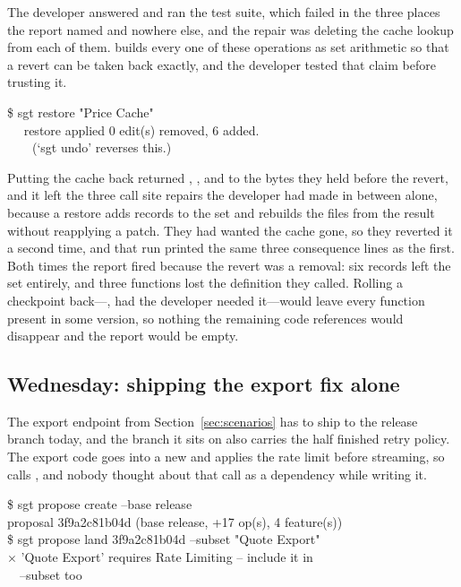 The developer answered  and ran the test suite, which failed in the three
places the report named and nowhere else, and the repair was deleting the cache lookup
from each of them. \sgt{} builds every one of these operations as set arithmetic so
that a revert can be taken back exactly, and the developer tested that claim before
trusting it.

\begin{out}
\$ sgt restore "Price Cache"\\
~~\ttok{} restore applied \ttdash{} 0 edit(s) removed, 6 added.\\
~~~~(`sgt undo' reverses this.)
\end{out}

\noindent
Putting the cache back returned , , and
 to the bytes they held before the revert, and it left the
three call site repairs the developer had made in between alone, because a restore
adds records to the set and rebuilds the files from the result without reapplying
a patch. They had wanted the cache gone, so they reverted it a second time, and
that run printed the same three consequence lines as the first.
Both times the report fired because the revert was a removal: six records left the
set entirely, and three functions lost the definition they called. Rolling a
checkpoint back---, had the developer
needed it---would leave every function present in some version, so nothing the
remaining code references would disappear and the report would be empty.

\subsection{Wednesday: shipping the export fix alone}

The export endpoint from Section~\ref{sec:scenarios} has to ship to the release
branch today, and the branch it sits on also carries the half finished retry policy.
The export code goes into a new  and applies the rate limit before
streaming, so  calls , and nobody
thought about that call as a dependency while writing it.

\begin{out}
\$ sgt propose create --base release\\
\ttok{} proposal 3f9a2c81b04d (base release, +17 op(s), 4 feature(s))\\
\$ sgt propose land 3f9a2c81b04d --subset "Quote Export"\\
\textnormal{$\times$} 'Quote Export' requires Rate Limiting -- include it in\\
~~--subset too
\end{out}

